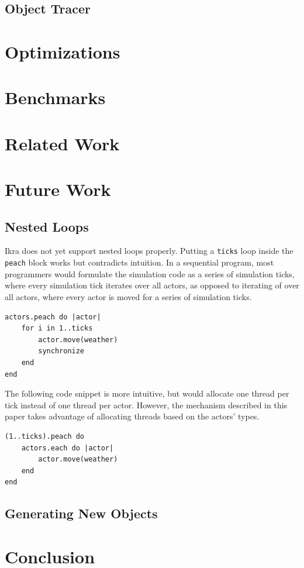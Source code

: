 \documentclass[preprint]{sigplanconf}
\begin{document}
\subsection{Object Tracer}
\label{sec:impl_tracer}


\section{Optimizations}


\section{Benchmarks}

\section{Related Work}

\section{Future Work}

\subsection{Nested Loops}
\label{sec:nested_loops}
Ikra does not yet support nested loops properly. Putting a \texttt{ticks} loop inside the \texttt{peach} block works but contradicts intuition. In a sequential program, most programmers would formulate the simulation code as a series of simulation ticks, where every simulation tick iterates over all actors, as opposed to iterating of over all actors, where every actor is moved for a series of simulation ticks.

\begin{lstlisting}
actors.peach do |actor|
    for i in 1..ticks
        actor.move(weather)
        synchronize
    end
end
\end{lstlisting}

The following code snippet is more intuitive, but would allocate one thread per tick instead of one thread per actor. However, the mechanism described in this paper takes advantage of allocating threads based on the actors' types.
\begin{lstlisting}
(1..ticks).peach do
    actors.each do |actor|
        actor.move(weather)
    end
end
\end{lstlisting}

\subsection{Generating New Objects}
\label{sec:gen_new_obj}

\section{Conclusion}




\end{document}
